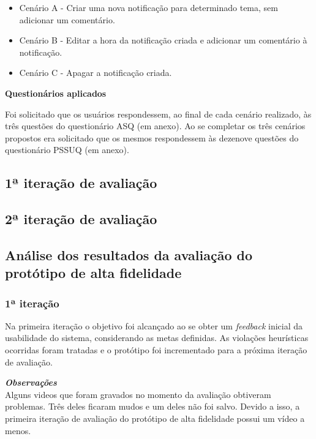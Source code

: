      \begin{itemize}
	  \item Cenário A - Criar uma nova notificação para determinado tema, sem adicionar um comentário.
	  \item Cenário B - Editar a hora da notificação criada e adicionar um comentário à notificação.
	  \item Cenário C - Apagar a notificação criada.
      \end{itemize}
      
      \noindent
      \textbf{Questionários aplicados}
      
	Foi solicitado que os usuários respondessem, ao final de cada cenário realizado, às três questões do
	questionário ASQ (em anexo). Ao se completar os três cenários propostos era solicitado que os mesmos 
	respondessem às dezenove questões do questionário PSSUQ (em anexo).
    
    \subsection{1ª iteração de avaliação}
      
	
  
      \pagebreak
      
    \subsection{2ª iteração de avaliação}
	
	
  
    \pagebreak
    \subsection{Análise dos resultados da avaliação do protótipo de alta fidelidade}
           
      \subsubsection{1ª iteração}
      
	Na primeira iteração o objetivo foi alcançado ao se obter um \textit{feedback} inicial da usabilidade do
	sistema, considerando as metas definidas. As violações heurísticas ocorridas foram tratadas e o protótipo foi
	incrementado para a próxima iteração de avaliação.
	
	\noindent
	\emph{\textbf{Observações}}\\
	Alguns videos que foram gravados no momento da avaliação obtiveram problemas. Três deles ficaram mudos e um deles não 
	foi salvo. Devido a isso, a primeira iteração de avaliação do protótipo de alta fidelidade possui um vídeo a menos.
      
